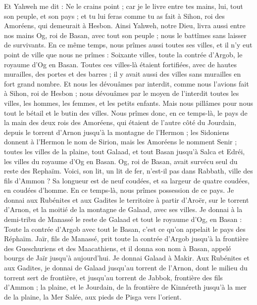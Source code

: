 \begin{multicols}{2}
Et Yahweh me dit : Ne le crains point ; car je le livre entre tes mains, lui, tout son peuple, et son pays ; et tu lui feras comme tu as fait à Sihon, roi des Amoréens, qui demeurait à Hesbon.
Ainsi Yahweh, notre Dieu, livra aussi entre nos mains Og, roi de Basan, avec tout son peuple ; nous le battîmes sans laisser de survivants.
En ce même temps, nous prîmes aussi toutes ses villes, et il n'y eut point de ville que nous ne prîmes : Soixante villes, toute la contrée d'Argob, le royaume d'Og en Basan.
Toutes ces villes-là étaient fortifiées, avec de hautes murailles, des portes et des barres ; il y avait aussi des villes sans murailles en fort grand nombre.
Et nous les dévouâmes par interdit, comme nous l'avions fait à Sihon, roi de Hesbon ; nous dévouâmes par le moyen de l'interdit toutes les villes, les hommes, les femmes, et les petits enfants.
Mais nous pillâmes pour nous tout le bétail et le butin des villes.
Nous prîmes donc, en ce temps-là, le pays de la main des deux rois des Amoréens, qui étaient de l'autre côté du Jourdain, depuis le torrent d'Arnon jusqu'à la montagne de l'Hermon ;
les Sidoniens donnent à l'Hermon le nom de Sirion, mais les Amoréens le nomment Senir ;
toutes les villes de la plaine, tout Galaad, et tout Basan jusqu'à Salca et Edréi, les villes du royaume d'Og en Basan.
Og, roi de Basan, avait survécu seul du reste des Rephaïm. Voici, son lit, un lit de fer, n'est-il pas dans Rabbath, ville des fils d'Ammon ? Sa longueur est de neuf coudées, et sa largeur de quatre coudées, en coudées d'homme.
En ce temps-là, nous prîmes possession de ce pays. Je donnai aux Rubénites et aux Gadites le territoire à partir d'Aroër, sur le torrent d'Arnon, et la moitié de la montagne de Galaad, avec ses villes.
Je donnai à la demi-tribu de Manassé le reste de Galaad et tout le royaume d'Og, en Basan : Toute la contrée d'Argob avec tout le Basan, c'est ce qu'on appelait le pays des Réphaïm.
Jaïr, fils de Manassé, prit toute la contrée d'Argob jusqu'à la frontière des Gueschuriens et des Maacathiens, et il donna son nom à Basan, appelé bourgs de Jaïr jusqu'à aujourd'hui.
Je donnai Galaad à Makir.
Aux Rubénites et aux Gadites, je donnai de Galaad jusqu'au torrent de l'Arnon, dont le milieu du torrent sert de frontière, et jusqu'au torrent de Jabbok, frontière des fils d'Ammon ;
la plaine, et le Jourdain, de la frontière de Kinnéreth jusqu'à la mer de la plaine, la Mer Salée, aux pieds de Pisga vers l'orient.

\end{multicols}
